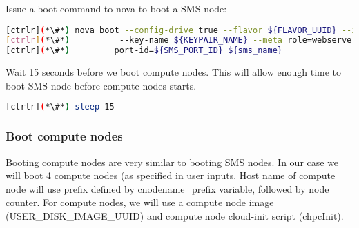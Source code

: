 	Issue a boot command to nova to boot a SMS node:


\begin{lstlisting}[language=bash,keywords={}]
[ctrlr](*\#*) nova boot --config-drive true --flavor ${FLAVOR_UUID} --image ${SMS_DISK_IMAGE_UUID} \
[ctrlr](*\#*)          --key-name ${KEYPAIR_NAME} --meta role=webservers --user-data=$chpcSMSInit --nic \ 
[ctrlr](*\#*)         port-id=${SMS_PORT_ID} ${sms_name}
\end{lstlisting} 

	Wait 15 seconds before we boot compute nodes. This will allow enough time to boot SMS node before compute nodes starts. 


\begin{lstlisting}[language=bash,keywords={}]
[ctrlr](*\#*) sleep 15
\end{lstlisting} 

\newpage
\subsubsection{Boot compute nodes}

	Booting compute nodes are very similar to booting SMS nodes. In our case we will boot 4 compute nodes (as specified in user inputs. Host name of compute node will use prefix defined by cnodename\_prefix variable, followed by node counter. For compute nodes, we will use a compute node image (USER\_DISK\_IMAGE\_UUID) and compute node cloud-init script (chpcInit). 


